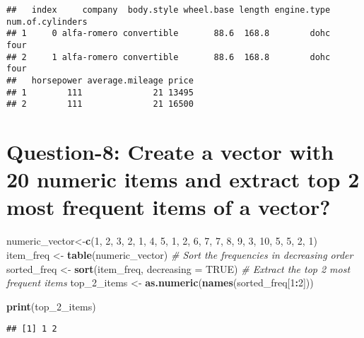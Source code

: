 \documentclass[
]{article}
\newenvironment{Shaded}{\begin{snugshade}}{\end{snugshade}}
\newcommand{\AttributeTok}[1]{\textcolor[rgb]{0.13,0.29,0.53}{#1}}
\newcommand{\CommentTok}[1]{\textcolor[rgb]{0.56,0.35,0.01}{\textit{#1}}}
\newcommand{\ConstantTok}[1]{\textcolor[rgb]{0.56,0.35,0.01}{#1}}
\newcommand{\DecValTok}[1]{\textcolor[rgb]{0.00,0.00,0.81}{#1}}
\newcommand{\FunctionTok}[1]{\textcolor[rgb]{0.13,0.29,0.53}{\textbf{#1}}}
\newcommand{\NormalTok}[1]{#1}
\newcommand{\OtherTok}[1]{\textcolor[rgb]{0.56,0.35,0.01}{#1}}
\newcommand{\SpecialCharTok}[1]{\textcolor[rgb]{0.81,0.36,0.00}{\textbf{#1}}}
\begin{document}
\begin{verbatim}
##   index     company  body.style wheel.base length engine.type num.of.cylinders
## 1     0 alfa-romero convertible       88.6  168.8        dohc             four
## 2     1 alfa-romero convertible       88.6  168.8        dohc             four
##   horsepower average.mileage price
## 1        111              21 13495
## 2        111              21 16500
\end{verbatim}

\hypertarget{question-8-create-a-vector-with-20-numeric-items-and-extract-top-2-most-frequent-items-of-a-vector}{%
\section{Question-8: Create a vector with 20 numeric items and extract
top 2 most frequent items of a
vector?}\label{question-8-create-a-vector-with-20-numeric-items-and-extract-top-2-most-frequent-items-of-a-vector}}

\begin{Shaded}
\begin{Highlighting}[]
\NormalTok{numeric\_vector}\OtherTok{\textless{}{-}}\FunctionTok{c}\NormalTok{(}\DecValTok{1}\NormalTok{, }\DecValTok{2}\NormalTok{, }\DecValTok{3}\NormalTok{, }\DecValTok{2}\NormalTok{, }\DecValTok{1}\NormalTok{, }\DecValTok{4}\NormalTok{, }\DecValTok{5}\NormalTok{, }\DecValTok{1}\NormalTok{, }\DecValTok{2}\NormalTok{, }\DecValTok{6}\NormalTok{, }\DecValTok{7}\NormalTok{, }\DecValTok{7}\NormalTok{, }\DecValTok{8}\NormalTok{, }\DecValTok{9}\NormalTok{, }\DecValTok{3}\NormalTok{, }\DecValTok{10}\NormalTok{, }\DecValTok{5}\NormalTok{, }\DecValTok{5}\NormalTok{, }\DecValTok{2}\NormalTok{, }\DecValTok{1}\NormalTok{)}
\NormalTok{item\_freq }\OtherTok{\textless{}{-}} \FunctionTok{table}\NormalTok{(numeric\_vector)}
\CommentTok{\# Sort the frequencies in decreasing order}
\NormalTok{sorted\_freq }\OtherTok{\textless{}{-}} \FunctionTok{sort}\NormalTok{(item\_freq, }\AttributeTok{decreasing =} \ConstantTok{TRUE}\NormalTok{)}
\CommentTok{\# Extract the top 2 most frequent items}
\NormalTok{top\_2\_items }\OtherTok{\textless{}{-}} \FunctionTok{as.numeric}\NormalTok{(}\FunctionTok{names}\NormalTok{(sorted\_freq[}\DecValTok{1}\SpecialCharTok{:}\DecValTok{2}\NormalTok{]))}

\FunctionTok{print}\NormalTok{(top\_2\_items)}
\end{Highlighting}
\end{Shaded}

\begin{verbatim}
## [1] 1 2
\end{verbatim}
\end{document}
